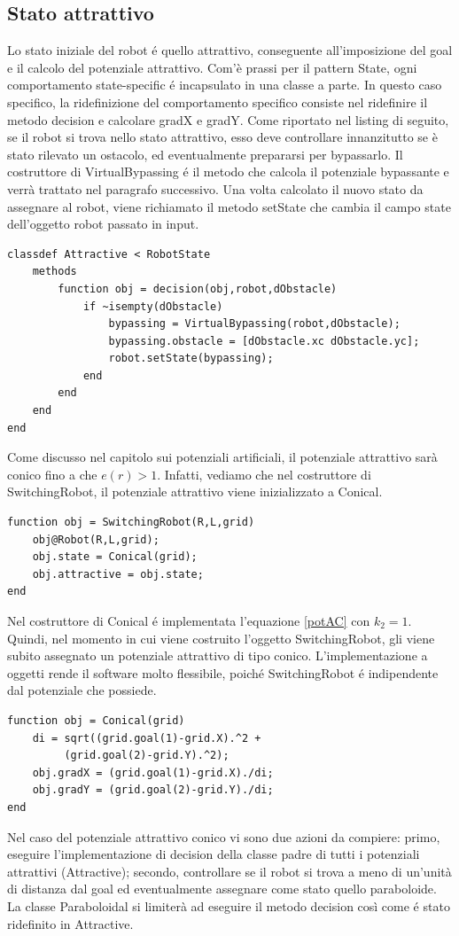 \documentclass[14pt,a4paper]{extarticle}
\begin{document}
\subsection{Stato attrattivo}
Lo stato iniziale del robot é quello attrattivo, conseguente all'imposizione del goal e il calcolo del potenziale attrattivo. Com'è prassi per il pattern State, ogni comportamento state-specific é incapsulato in una classe a parte. In questo caso specifico, la ridefinizione del comportamento specifico consiste nel ridefinire il metodo decision e calcolare gradX e gradY. Come riportato nel listing di seguito, se il robot si trova nello stato attrattivo, esso deve controllare innanzitutto se è stato rilevato un ostacolo, ed eventualmente prepararsi per bypassarlo. Il costruttore di VirtualBypassing é il metodo che calcola il potenziale bypassante e verrà trattato nel paragrafo successivo. Una volta calcolato il nuovo stato da assegnare al robot, viene richiamato il metodo setState che cambia il campo state dell'oggetto robot passato in input. 
\begin{lstlisting}
classdef Attractive < RobotState
	methods
		function obj = decision(obj,robot,dObstacle)
			if ~isempty(dObstacle)
				bypassing = VirtualBypassing(robot,dObstacle);
				bypassing.obstacle = [dObstacle.xc dObstacle.yc];
				robot.setState(bypassing);
			end
		end
	end
end
\end{lstlisting}
Come discusso nel capitolo sui potenziali artificiali, il potenziale attrattivo sarà conico fino a che \(e(r) > 1\). Infatti, vediamo che nel costruttore di SwitchingRobot, il potenziale attrattivo viene inizializzato a Conical.
\begin{lstlisting}
function obj = SwitchingRobot(R,L,grid)
	obj@Robot(R,L,grid);
	obj.state = Conical(grid);
	obj.attractive = obj.state;
end
\end{lstlisting}
Nel costruttore di Conical é implementata l'equazione \ref{potAC} con \(k_2=1\). Quindi, nel momento in cui viene costruito l'oggetto SwitchingRobot, gli viene subito assegnato un potenziale attrattivo di tipo conico. L'implementazione a oggetti rende il software molto flessibile, poiché SwitchingRobot é indipendente dal potenziale che possiede. 
\begin{lstlisting}
function obj = Conical(grid)
	di = sqrt((grid.goal(1)-grid.X).^2 +
		 (grid.goal(2)-grid.Y).^2);
	obj.gradX = (grid.goal(1)-grid.X)./di; 
	obj.gradY = (grid.goal(2)-grid.Y)./di;
end
\end{lstlisting}
Nel caso del potenziale attrattivo conico vi sono due azioni da compiere: primo, eseguire l'implementazione di decision della classe padre di tutti i potenziali attrattivi (Attractive); secondo, controllare se il robot si trova a meno di un'unità di distanza dal goal ed eventualmente assegnare come stato quello paraboloide. La classe Paraboloidal si limiterà ad eseguire il metodo decision così come é stato ridefinito in Attractive.
\end{document}
